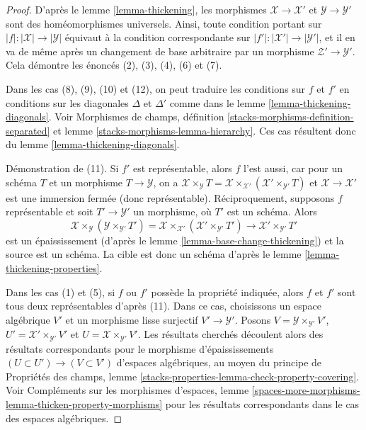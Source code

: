 \begin{proof}
D'après le lemme \ref{lemma-thickening}, les morphismes $\mathcal{X} \to \mathcal{X}'$
et $\mathcal{Y} \to \mathcal{Y}'$ sont des homéomorphismes universels. Ainsi, toute
condition portant sur $|f| : |\mathcal{X}| \to |\mathcal{Y}|$ équivaut à
la condition correspondante sur $|f'| : |\mathcal{X}'| \to |\mathcal{Y}'|$,
et il en va de même après un changement de base arbitraire par un morphisme
$\mathcal{Z}' \to \mathcal{Y}'$. Cela démontre les
énoncés (2), (3), (4), (6) et (7).

\medskip\noindent
Dans les cas (8), (9), (10) et (12), on peut traduire les conditions sur
$f$ et $f'$ en conditions sur les diagonales $\Delta$ et $\Delta'$
comme dans le lemme \ref{lemma-thickening-diagonals}. Voir
Morphismes de champs, définition \ref{stacks-morphisms-definition-separated} et
lemme \ref{stacks-morphisms-lemma-hierarchy}.
Ces cas résultent donc du lemme \ref{lemma-thickening-diagonals}.

\medskip\noindent
Démonstration de (11). Si $f'$ est représentable, alors $f$ l'est aussi, car
pour un schéma $T$ et un morphisme $T \to \mathcal{Y}$, on a
$\mathcal{X} \times_\mathcal{Y} T =
\mathcal{X} \times_{\mathcal{X}'} (\mathcal{X}' \times_{\mathcal{Y}'} T)$
et $\mathcal{X} \to \mathcal{X}'$ est une immersion fermée (donc représentable).
Réciproquement, supposons $f$ représentable et soit $T' \to \mathcal{Y}'$
un morphisme, où $T'$ est un schéma. Alors
$$
\mathcal{X} \times_{\mathcal{Y}}
(\mathcal{Y} \times_{\mathcal{Y}'} T') =
\mathcal{X} \times_{\mathcal{X}'}
(\mathcal{X}' \times_{\mathcal{Y}'} T') \to
\mathcal{X}' \times_{\mathcal{Y}'} T'
$$
est un épaississement (d'après le lemme \ref{lemma-base-change-thickening})
et la source est un schéma. La cible est donc un schéma d'après le
lemme \ref{lemma-thickening-properties}.

\medskip\noindent
Dans les cas (1) et (5), si $f$ ou $f'$ possède la propriété indiquée,
alors $f$ et $f'$ sont tous deux représentables d'après (11). Dans ce cas,
choisissons un espace algébrique $V'$ et un morphisme lisse surjectif
$V' \to \mathcal{Y}'$. Posons $V = \mathcal{Y} \times_{\mathcal{Y}'} V'$,
$U' = \mathcal{X}' \times_{\mathcal{Y}'} V'$ et
$U = \mathcal{X} \times_{\mathcal{Y}'} V'$. Les résultats cherchés
découlent alors des résultats correspondants pour
le morphisme d'épaississements $(U \subset U') \to (V \subset V')$
d'espaces algébriques, au moyen du principe de Propriétés des champs, lemme
\ref{stacks-properties-lemma-check-property-covering}.
Voir Compléments sur les morphismes d'espaces, lemme
\ref{spaces-more-morphisms-lemma-thicken-property-morphisms}
pour les résultats correspondants dans le cas des espaces algébriques.
\end{proof}





